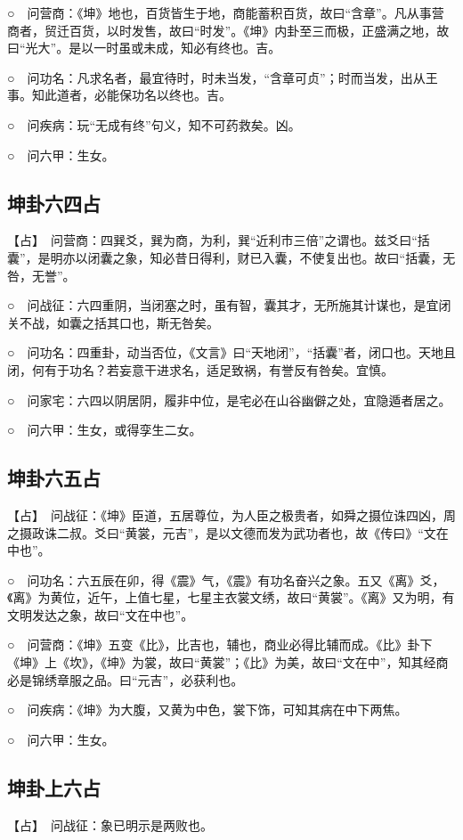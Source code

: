 \documentclass[12pt,oneside]{book}
\begin{document}
○　问营商：《坤》地也，百货皆生于地，商能蓄积百货，故曰“含章”。凡从事营商者，贸迁百货，以时发售，故曰“时发”。《坤》内卦至三而极，正盛满之地，故曰“光大”。是以一时虽或未成，知必有终也。吉。

○　问功名：凡求名者，最宜待时，时未当发，“含章可贞”；时而当发，出从王事。知此道者，必能保功名以终也。吉。

○　问疾病：玩“无成有终”句义，知不可药救矣。凶。

○　问六甲：生女。


\subsection{坤卦六四占}
【占】　问营商：四巽爻，巽为商，为利，巽“近利市三倍”之谓也。兹爻曰“括囊”，是明亦以闭囊之象，知必昔日得利，财已入囊，不使复出也。故曰“括囊，无咎，无誉”。

○　问战征：六四重阴，当闭塞之时，虽有智，囊其才，无所施其计谋也，是宜闭关不战，如囊之括其口也，斯无咎矣。

○　问功名：四重卦，动当否位，《文言》曰“天地闭”，“括囊”者，闭口也。天地且闭，何有于功名？若妄意干进求名，适足致祸，有誉反有咎矣。宜慎。

○　问家宅：六四以阴居阴，履非中位，是宅必在山谷幽僻之处，宜隐遁者居之。

○　问六甲：生女，或得孪生二女。

\subsection{坤卦六五占}
【占】　问战征：《坤》臣道，五居尊位，为人臣之极贵者，如舜之摄位诛四凶，周之摄政诛二叔。爻曰“黄裳，元吉”，是以文德而发为武功者也，故《传曰》“文在中也”。

○　问功名：六五辰在卯，得《震》气，《震》有功名奋兴之象。五又《离》爻，《离》为黄位，近午，上值七星，七星主衣裳文绣，故曰“黄裳”。《离》又为明，有文明发达之象，故曰“文在中也”。

○　问营商：《坤》五变《比》，比吉也，辅也，商业必得比辅而成。《比》卦下《坤》上《坎》，《坤》为裳，故曰“黄裳”；《比》为美，故曰“文在中”，知其经商必是锦绣章服之品。曰“元吉”，必获利也。

○　问疾病：《坤》为大腹，又黄为中色，裳下饰，可知其病在中下两焦。

○　问六甲：生女。

\subsection{坤卦上六占}
【占】　问战征：象已明示是两败也。
\end{document}
